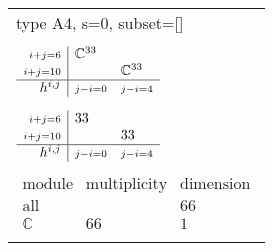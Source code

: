 \documentclass[crop,border=2mm]{standalone}
\begin{document}
\begin{tabular}{l}
{\huge type A4, s=0, subset=[]}\\ \\


$\displaystyle
\begin{array}{r|l l}
	{\scriptstyle i+j=6}&\mathbb{C}^{33}&\\
	{\scriptstyle i+j=10}&&\mathbb{C}^{33}\\
	\hline h^{i,j}&{\scriptstyle j-i=0}&{\scriptstyle j-i=4}
\end{array}
$ \\ \\


$\displaystyle
\begin{array}{r|l l}
	{\scriptstyle i+j=6}&33&\\
	{\scriptstyle i+j=10}&&33\\
	\hline h^{i,j}&{\scriptstyle j-i=0}&{\scriptstyle j-i=4}
\end{array}
$ \\ \\


$\displaystyle
\begin{array}{rll}
	\text{module}&\text{multiplicity}&\text{dimension} \\ \hline \text{all}&&66 \\
	\mathbb{C}&66&1
\end{array}
$ \\ \\

\end{tabular}
\end{document}
